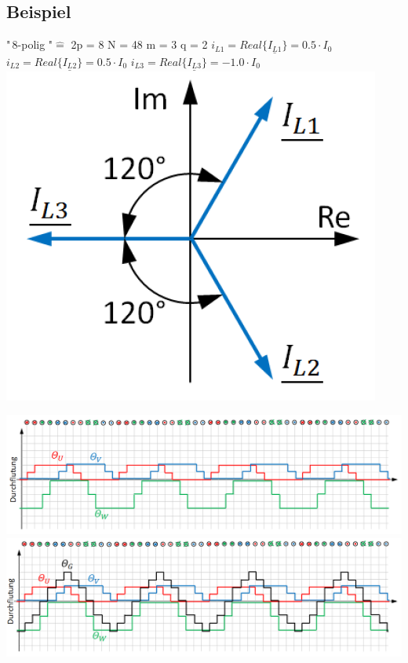 \subsection{Beispiel}%
\begin{minipage}[b]{0.4\linewidth}	
"\,8-polig "\quad$\widehat{=}$ \quad 2p = 8 \newline
N = 48 \newline
m = 3 \newline
q = 2 \newline \newline
$i_{L1} = Real\{\underline{I_{L1}}\} = 0.5\cdot I_0$ \newline \newline
$i_{L2} = Real\{\underline{I_{L2}}\} = 0.5\cdot I_0$ \newline \newline
$i_{L3} = Real\{\underline{I_{L3}}\} = -1.0\cdot I_0$ 
\newline \newline
	\includegraphics[scale = 0.4]{images/StromdreieckAGS}
\end{minipage}
\hspace{-0.5cm}
\begin{minipage}[b]{0.4\linewidth}
\includegraphics[scale = 0.35]{images/Durchflutung3} \newline
\includegraphics[scale = 0.35]{images/Durchflutung4} \newline

\end{minipage}
\clearpage